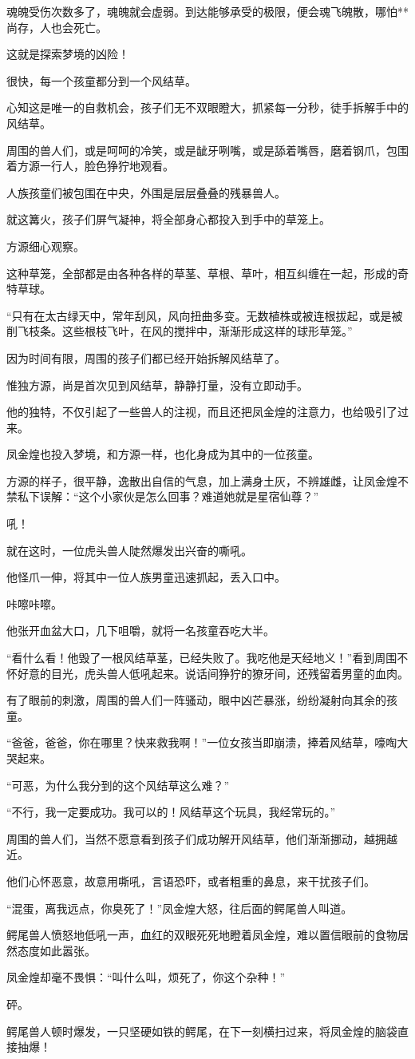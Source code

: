 \begin{this_body}
魂魄受伤次数多了，魂魄就会虚弱。到达能够承受的极限，便会魂飞魄散，哪怕**尚存，人也会死亡。

这就是探索梦境的凶险！

很快，每一个孩童都分到一个风结草。

心知这是唯一的自救机会，孩子们无不双眼瞪大，抓紧每一分秒，徒手拆解手中的风结草。

周围的兽人们，或是呵呵的冷笑，或是龇牙咧嘴，或是舔着嘴唇，磨着钢爪，包围着方源一行人，脸色狰狞地观看。

人族孩童们被包围在中央，外围是层层叠叠的残暴兽人。

就这篝火，孩子们屏气凝神，将全部身心都投入到手中的草笼上。

方源细心观察。

这种草笼，全部都是由各种各样的草茎、草根、草叶，相互纠缠在一起，形成的奇特草球。

“只有在太古绿天中，常年刮风，风向扭曲多变。无数植株或被连根拔起，或是被削飞枝条。这些根枝飞叶，在风的搅拌中，渐渐形成这样的球形草笼。”

因为时间有限，周围的孩子们都已经开始拆解风结草了。

惟独方源，尚是首次见到风结草，静静打量，没有立即动手。

他的独特，不仅引起了一些兽人的注视，而且还把凤金煌的注意力，也给吸引了过来。

凤金煌也投入梦境，和方源一样，也化身成为其中的一位孩童。

方源的样子，很平静，逸散出自信的气息，加上满身土灰，不辨雄雌，让凤金煌不禁私下误解：“这个小家伙是怎么回事？难道她就是星宿仙尊？”

吼！

就在这时，一位虎头兽人陡然爆发出兴奋的嘶吼。

他怪爪一伸，将其中一位人族男童迅速抓起，丢入口中。

咔嚓咔嚓。

他张开血盆大口，几下咀嚼，就将一名孩童吞吃大半。

“看什么看！他毁了一根风结草茎，已经失败了。我吃他是天经地义！”看到周围不怀好意的目光，虎头兽人低吼起来。说话间狰狞的獠牙间，还残留着男童的血肉。

有了眼前的刺激，周围的兽人们一阵骚动，眼中凶芒暴涨，纷纷凝射向其余的孩童。

“爸爸，爸爸，你在哪里？快来救我啊！”一位女孩当即崩溃，捧着风结草，嚎啕大哭起来。

“可恶，为什么我分到的这个风结草这么难？”

“不行，我一定要成功。我可以的！风结草这个玩具，我经常玩的。”

周围的兽人们，当然不愿意看到孩子们成功解开风结草，他们渐渐挪动，越拥越近。

他们心怀恶意，故意用嘶吼，言语恐吓，或者粗重的鼻息，来干扰孩子们。

“混蛋，离我远点，你臭死了！”凤金煌大怒，往后面的鳄尾兽人叫道。

鳄尾兽人愤怒地低吼一声，血红的双眼死死地瞪着凤金煌，难以置信眼前的食物居然态度如此嚣张。

凤金煌却毫不畏惧：“叫什么叫，烦死了，你这个杂种！”

砰。

鳄尾兽人顿时爆发，一只坚硬如铁的鳄尾，在下一刻横扫过来，将凤金煌的脑袋直接抽爆！

\end{this_body}


